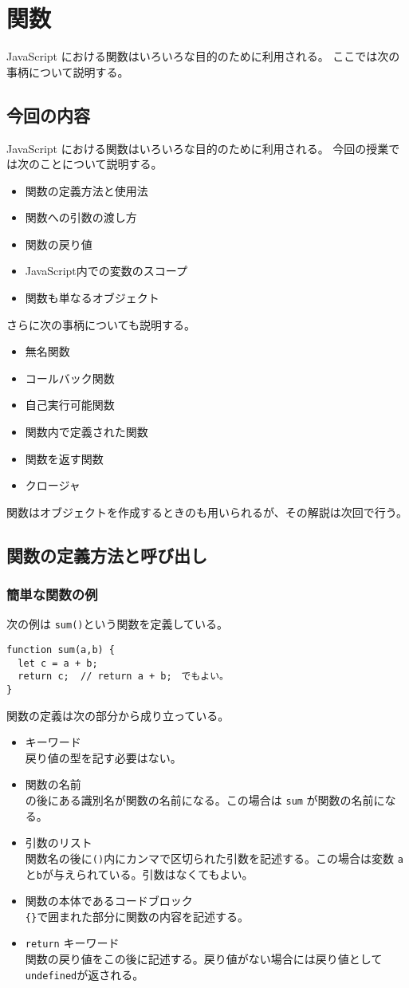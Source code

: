 \chapter{関数}
\ifText
JavaScript における関数はいろいろな目的のために利用される。
ここでは次の事柄について説明する。
\else
\section{今回の内容}
JavaScript における関数はいろいろな目的のために利用される。
今回の授業では次のことについて説明する。
\fi
\begin{itemize}
 \item 関数の定義方法と使用法
 \item 関数への引数の渡し方
 \item 関数の戻り値
 \item JavaScript内での変数のスコープ
 \item 関数も単なるオブジェクト
\end{itemize}
さらに次の事柄についても説明する。
\begin{itemize}
 \item 無名関数
 \item コールバック関数
 \item 自己実行可能関数
 \item 関数内で定義された関数
 \item 関数を返す関数
 \item クロージャ
\end{itemize}
関数はオブジェクトを作成するときのも用いられるが、その解説は次回で行う。
\section{関数の定義方法と呼び出し}
\subsection{簡単な関数の例}
次の例は \Verb+sum()+という関数を定義している。
\begin{Verbatim}
function sum(a,b) {
  let c = a + b;
  return c;  // return a + b;　でもよい。
}
\end{Verbatim}
関数の定義は次の部分から成り立っている。
\begin{itemize}
 \item {}キーワード\\
戻り値の型を記す必要はない。
 \item 関数の名前\\
 の後にある識別名が関数の名前になる。この場合は \texttt{sum}
       が関数の名前になる。
 \item 引数のリスト\\
関数名の後に\Verb+()+内にカンマで区切られた引数を記述する。この場合は変数
       \Verb+a+と\Verb+b+が与えられている。引数はなくてもよい。
 \item 関数の本体であるコードブロック\\
\Verb+{}+で囲まれた部分に関数の内容を記述する。
\item \Verb+return+ キーワード\\
関数の戻り値をこの後に記述する。戻り値がない場合には戻り値として
       \Verb+undefined+が返される。
\end{itemize}
